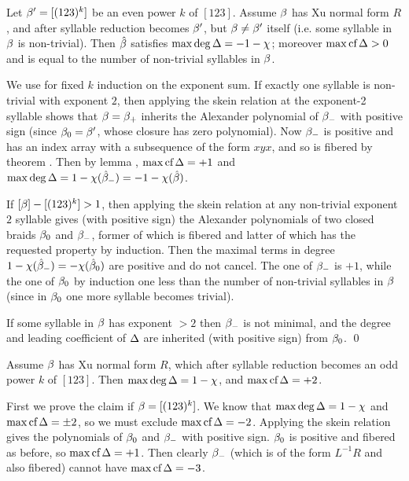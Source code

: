 \begin{lemma}\label{ty}
Let $\beta'=[(123)^k]$ be an even power $k$ of $[123]$.
Assume $\beta$ has Xu normal form $R$, and after syllable
reduction becomes $\beta'$, but $\beta\ne\beta'$ itself (i.e. some
syllable in $\beta$ is non-trivial). Then $\hat{\beta}$ satisfies
$\max\deg\Delta=-1-\chi$; moreover $\max\text{\rm cf}\,\Delta>0$ and is equal to the 
number of non-trivial syllables in $\beta$.
\end{lemma}

\proof We use for fixed $k$ induction on the exponent sum.
If exactly one syllable is non-trivial with exponent $2$,
then applying the skein relation at the exponent-2
syllable shows that $\beta=\beta_+$ inherits the Alexander
polynomial of $\beta_-$ with positive sign (since $\beta_0=\beta'$,
whose closure has zero polynomial). 
Now $\beta_-$ is positive and has an index array with a subsequence
of the form $xyx$, and so is fibered by theorem .
Then by lemma , $\max\text{\rm cf}\,\Delta=+1$ and
$\max\deg\Delta=1-\chi(\hat{\beta}_-)=-1-\chi(\hat{\beta})$.

If $[\beta]-[(123)^k]>1$, then applying the skein relation
at any non-trivial exponent $2$ syllable gives (with positive
sign) the Alexander polynomials of two closed braids
$\beta_0$ and $\beta_-$, former of which is fibered and
latter of which has the requested property by induction.
Then the maximal terms in degree $1-\chi(\hat{\beta}_-)=
-\chi(\hat{\beta}_0)$ are positive and do not cancel.
The one of $\beta_-$ is $+1$, while the one of $\beta_0$
by induction one less than the number of non-trivial 
syllables in $\beta$ (since in $\beta_0$ one more syllable
becomes trivial).

If some syllable in $\beta$ has exponent $>2$ then $\beta_-$ is
not minimal, and the degree and leading coefficient of $\Delta$
are inherited (with positive sign) from $\beta_0$. \qed

\begin{lemma}\label{tz}
Assume $\beta$ has Xu normal form $R$, which after syllable
reduction becomes an odd power $k$ of $[123]$.
Then $\max\deg\Delta=1-\chi$, and $\max\text{\rm cf}\,\Delta=+2$.
\end{lemma}

\proof First we prove the claim if $\beta=[(123)^k]$.
We know that $\max\deg\Delta=1-\chi$ and $\max\text{\rm cf}\,\Delta=\pm 2$,
so we must exclude $\max\text{\rm cf}\,\Delta=-2$. Applying the skein relation gives
the polynomials of $\beta_0$ and $\beta_-$ with positive sign.
$\beta_0$ is positive and fibered as before, so $\max\text{\rm cf}\,\Delta=+1$.
Then clearly $\beta_-$ (which is of the form $L^{-1}R$ and also
fibered) cannot have $\max\text{\rm cf}\,\Delta=-3$. 

